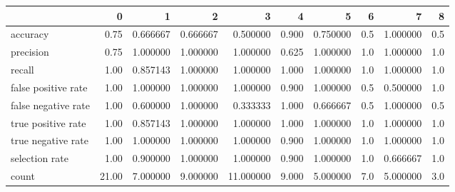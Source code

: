 \begin{tabular}{lrrrrrrrrr}
\toprule
{} &      0 &         1 &         2 &          3 &      4 &         5 &    6 &         7 &    8 \\
\midrule
accuracy            &   0.75 &  0.666667 &  0.666667 &   0.500000 &  0.900 &  0.750000 &  0.5 &  1.000000 &  0.5 \\
precision           &   0.75 &  1.000000 &  1.000000 &   1.000000 &  0.625 &  1.000000 &  1.0 &  1.000000 &  1.0 \\
recall              &   1.00 &  0.857143 &  1.000000 &   1.000000 &  1.000 &  1.000000 &  1.0 &  1.000000 &  1.0 \\
false positive rate &   1.00 &  1.000000 &  1.000000 &   1.000000 &  0.900 &  1.000000 &  0.5 &  0.500000 &  1.0 \\
false negative rate &   1.00 &  0.600000 &  1.000000 &   0.333333 &  1.000 &  0.666667 &  0.5 &  1.000000 &  0.5 \\
true positive rate  &   1.00 &  0.857143 &  1.000000 &   1.000000 &  1.000 &  1.000000 &  1.0 &  1.000000 &  1.0 \\
true negative rate  &   1.00 &  1.000000 &  1.000000 &   1.000000 &  0.900 &  1.000000 &  1.0 &  1.000000 &  1.0 \\
selection rate      &   1.00 &  0.900000 &  1.000000 &   1.000000 &  0.900 &  1.000000 &  1.0 &  0.666667 &  1.0 \\
count               &  21.00 &  7.000000 &  9.000000 &  11.000000 &  9.000 &  5.000000 &  7.0 &  5.000000 &  3.0 \\
\bottomrule
\end{tabular}
